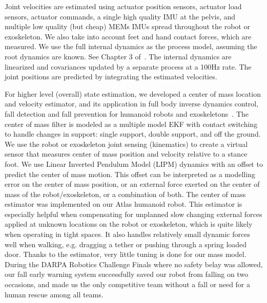 \documentclass[letterpaper,12pt,fullpage]{article}
\begin{document}
Joint velocities are estimated using actuator position sensors, actuator load
sensors, actuator commands, a single high
quality IMU at the pelvis, and multiple low quality (but cheap) MEMs IMUs
spread throughout the robot or exoskeleton. We also take into account feet and hand
contact forces, which
are measured. We use the full internal dynamics as the process model,
assuming the root dynamics are known. See Chapter 3 of~\cite{Xinjelefu-thesis}.
The internal dynamics are linearized and covariances updated
by a separate process at a 100Hz rate.
The joint positions are predicted by integrating the estimated velocities.

For higher level (overall) state estimation,
we developed a center of mass location and velocity estimator, and its
application in full body inverse dynamics control, fall detection
and fall prevention for humanoid robots and exoskeletons~\cite{}.
The center of mass filter is modeled as a multiple model EKF with contact switching
to handle changes in support: single support, double support, and off the ground.
We use the robot or exoskeleton
joint sensing (kinematics) to create a virtual sensor that measures
center of mass position and velocity relative to a stance foot.
We use Linear
Inverted Pendulum Model (LIPM) dynamics with an offset to predict
the center of mass motion. This offset can be interpreted
as a modelling error on the center of mass position, or an
external force exerted on the center of mass of the robot/exoskeleton,
or a combination of both. The center of mass estimator was
implemented on our Atlas humanoid robot. 
This estimator is especially helpful when compensating
for unplanned slow changing external forces applied at
unknown locations on the robot or exoskeleton, which is quite likely when
operating in tight spaces. It also handles relatively small
dynamic forces well when walking, e.g. dragging a tether
or pushing through a spring loaded door. Thanks to
the estimator, very little tuning is done for our mass model.
During the DARPA
Robotics Challenge Finals
where no safety belay was
allowed, our fall early warning system
successfully saved our robot from
falling on two occasions, and made us the only competitive team
without a fall or need for a human rescue among all teams.
\end{document}
